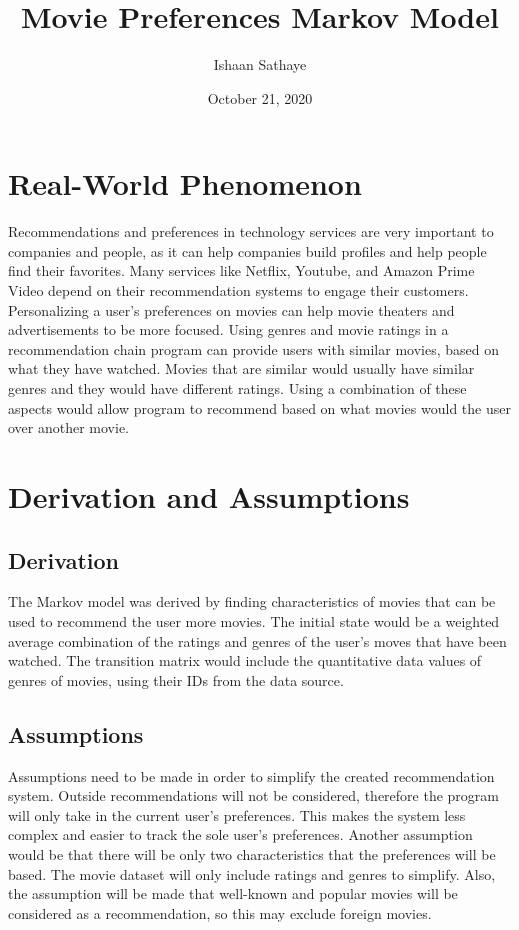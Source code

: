 \documentclass{article}
\title{Movie Preferences Markov Model}
\author{Ishaan Sathaye }
\date{October 21, 2020}
\begin{document}
\maketitle

\section{Real-World Phenomenon}
Recommendations and preferences in technology services are very important to 
companies and people, as it can help companies build profiles and help people find their favorites.
Many services like Netflix, Youtube, and Amazon Prime Video depend on their recommendation systems to engage their customers.
Personalizing a user's preferences on movies can help movie theaters and advertisements to be more focused. Using genres and movie ratings
in a recommendation chain program can provide users with similar movies, based on what they have watched. Movies that are similar would 
usually have similar genres and they would have different ratings. Using a combination of these aspects would allow program to 
recommend based on what movies would the user over another movie. 

\section{Derivation and Assumptions}
\subsection{Derivation}
The Markov model was derived by finding characteristics of movies that can be used to recommend the user more movies. The initial state would be 
a weighted average combination of the ratings and genres of the user's moves that have been watched. The transition matrix would include the 
quantitative data values of genres of movies, using their IDs from the data source. 

\subsection{Assumptions}
Assumptions need to be made in order to simplify the created recommendation system. Outside recommendations will not be considered, therefore the program will only take in 
the current user's preferences. This makes the system less complex and easier to track the sole user's preferences. 
Another assumption would be that there will be only two characteristics that the preferences will be based. The movie dataset will only include ratings and 
genres to simplify. Also, the assumption will be made that well-known and popular movies will be considered as a recommendation, so this may exclude foreign movies.
\end{document}
